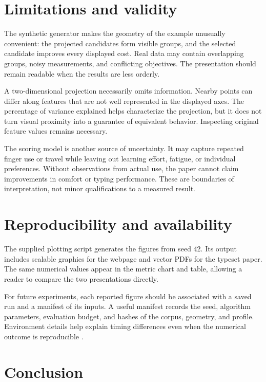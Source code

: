 \documentclass{gecko-paper}
\begin{document}
\begin{paperbody}
\section{Limitations and validity}

The synthetic generator makes the geometry of the example unusually convenient: the projected candidates form visible groups, and the selected candidate improves every displayed cost. Real data may contain overlapping groups, noisy measurements, and conflicting objectives. The presentation should remain readable when the results are less orderly.

A two-dimensional projection necessarily omits information. Nearby points can differ along features that are not well represented in the displayed axes. The percentage of variance explained helps characterize the projection, but it does not turn visual proximity into a guarantee of equivalent behavior. Inspecting original feature values remains necessary.

The scoring model is another source of uncertainty. It may capture repeated finger use or travel while leaving out learning effort, fatigue, or individual preferences. Without observations from actual use, the paper cannot claim improvements in comfort or typing performance. These are boundaries of interpretation, not minor qualifications to a measured result.

\section{Reproducibility and availability}

The supplied plotting script generates the figures from seed 42. Its output includes scalable graphics for the webpage and vector PDFs for the typeset paper. The same numerical values appear in the metric chart and table, allowing a reader to compare the two presentations directly.

For future experiments, each reported figure should be associated with a saved run and a manifest of its inputs. A useful manifest records the seed, algorithm parameters, evaluation budget, and hashes of the corpus, geometry, and profile. Environment details help explain timing differences even when the numerical outcome is reproducible .

\section{Conclusion}


\end{paperbody}
\end{document}
